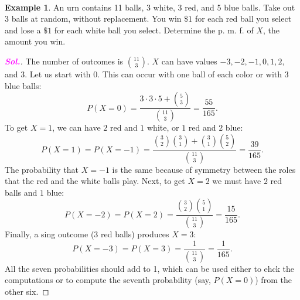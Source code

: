 \documentclass[12pt,a4paper]{article}
\theoremstyle{definition}
\newtheorem{example}{Example}[section]
\theoremstyle{definition}
\theoremstyle{definition}
\theoremstyle{definition}
\theoremstyle{remark}
\theoremstyle{definition}
\newcommand{\sol}{\textcolor{magenta}{\bf \textit{Sol.}}\quad}
\begin{document}
\
\begin{example}
	An urn contains 11 balls, 3 white, 3 red, and 5 blue balls. Take out 3 balls at random, without replacement. You win $\$1$ for each red ball you select and lose a $\$1$ for each white ball you select. Determine the p. m. f. of $X$, the amount you win.\begin{proof}[\sol]
		The number of outcomes is $\binom{11}{3}$. $X$ can have values $-3,-2,-1,0,1,2,$ and $3$. Let us start with $0$. This can occur with one ball of each color or with $3$ blue balls: \[
		P(X=0)=\frac{3\cdot3\cdot5+\binom{5}{3}}{\binom{11}{3}}=\frac{55}{165}.
		\] To get $X=1$, we can have $2$ red and $1$ white, or $1$ red and $2$ blue: \[
		P(X=1)=P(X=-1)=\frac{\binom{3}{2}\binom{3}{1}+\binom{3}{1}\binom{5}{2}}{\binom{11}{3}}=\frac{39}{165}.
		\] The probability that $X=-1$ is the same because of symmetry between the roles that the red and the white balls play. Next, to get $X=2$ we must have $2$ red balls and $1$ blue: \[
		P(X=-2)=P(X=2)=\frac{\binom{3}{2}\binom{5}{1}}{\binom{11}{3}}=\frac{15}{165}.
		\] Finally, a sing outcome ($3$ red balls) produces $X=3$: \[
		P(X=-3)=P(X=3)=\frac{1}{\binom{11}{3}}=\frac{1}{165}.
		\] All the seven probabilities should add to 1, which can be used either to ehck the computations or to compute the seventh probability (say, $P(X=0)$) from the other six.
	\end{proof}
\end{example}
\end{document}
